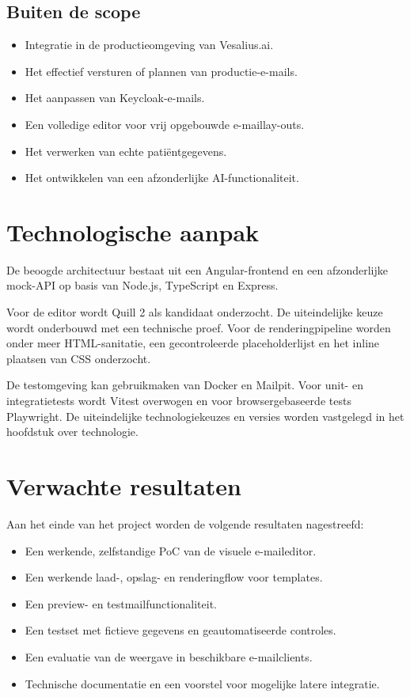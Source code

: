 \subsection{Buiten de scope}

\begin{itemize}
    \item Integratie in de productieomgeving van Vesalius.ai.
    \item Het effectief versturen of plannen van productie-e-mails.
    \item Het aanpassen van Keycloak-e-mails.
    \item Een volledige editor voor vrij opgebouwde e-maillay-outs.
    \item Het verwerken van echte patiëntgegevens.
    \item Het ontwikkelen van een afzonderlijke AI-functionaliteit.
\end{itemize}

\section{Technologische aanpak}
De beoogde architectuur bestaat uit een Angular-frontend en een afzonderlijke
mock-API op basis van Node.js, TypeScript en Express.

Voor de editor wordt Quill 2 als kandidaat onderzocht. De uiteindelijke keuze
wordt onderbouwd met een technische proef. Voor de renderingpipeline worden
onder meer HTML-sanitatie, een gecontroleerde placeholderlijst en het inline
plaatsen van CSS onderzocht.

De testomgeving kan gebruikmaken van Docker en Mailpit. Voor unit- en
integratietests wordt Vitest overwogen en voor browsergebaseerde tests
Playwright. De uiteindelijke technologiekeuzes en versies worden vastgelegd
in het hoofdstuk over technologie.

\section{Verwachte resultaten}
Aan het einde van het project worden de volgende resultaten nagestreefd:

\begin{itemize}
    \item Een werkende, zelfstandige PoC van de visuele e-maileditor.
    \item Een werkende laad-, opslag- en renderingflow voor templates.
    \item Een preview- en testmailfunctionaliteit.
    \item Een testset met fictieve gegevens en geautomatiseerde controles.
    \item Een evaluatie van de weergave in beschikbare e-mailclients.
    \item Technische documentatie en een voorstel voor mogelijke latere
    integratie.
\end{itemize}

